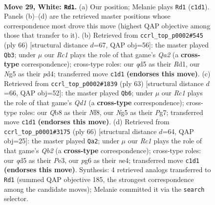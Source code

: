\documentclass[11pt]{article}
\begin{document}
\clearpage

\begin{figure}[p]\centering
\begin{subfigure}{0.46\textwidth}\centering
\resizebox{\linewidth}{!}{%
\newchessgame
\chessboard[
  setfen={1Q6/4npk1/6p1/3q2Np/3p3P/3P2P1/5P2/rNR3K1 w - - 5 29},
  showmover=false,
  pgfstyle=straightmove, color=movearrow, markmove={c1-d1}
]}
\caption{}
\end{subfigure}\hfill
\begin{subfigure}{0.46\textwidth}\centering
\resizebox{\linewidth}{!}{%
\newchessgame
\chessboard[
  setfen={5b2/5pk1/4qp2/2rNp3/3pP3/8/Q4PPP/3R2K1 w - - 7 34},
  showmover=false,
  pgfstyle=straightmove, color=movearrow, markmove={a2-b3}
]}
\caption{}
\end{subfigure}
\\[4pt]
\begin{subfigure}{0.46\textwidth}\centering
\resizebox{\linewidth}{!}{%
\newchessgame
\chessboard[
  setfen={3q1nk1/1p3pp1/7p/r2nQP2/8/1B2PN2/6PP/2R3K1 b - - 5 32},
  showmover=false,
  pgfstyle=straightmove, color=movearrow, markmove={d8-b6}
]}
\caption{}
\end{subfigure}\hfill
\begin{subfigure}{0.46\textwidth}\centering
\resizebox{\linewidth}{!}{%
\newchessgame
\chessboard[
  setfen={8/5p1k/p4qp1/P2p4/3Nn2p/4P2P/1Q3PP1/6K1 w - - 8 34},
  showmover=false,
  pgfstyle=straightmove, color=movearrow, markmove={b2-a2}
]}
\caption{}
\end{subfigure}
\caption{\textbf{Move 29, White: \texttt{Rd1}.} (a) Our position; Melanie plays \texttt{Rd1} (\texttt{c1d1}). Panels (b)--(d) are the retrieved master positions whose correspondence most drove this move (highest QAP objective among those that transfer to it). (b) Retrieved from \texttt{ccrl\_top\_p0002\#545} (ply 66) [structural distance $d$=67, QAP obj=56]: the master played \texttt{Qb3}; under $\mu$ our \emph{Rc1} plays the role of that game's \emph{Qa2} (a \textbf{cross-type} correspondence); cross-type roles: our \emph{q}d5 as their \emph{R}d1, our \emph{N}g5 as their \emph{p}d4; transferred move \texttt{c1d1} \textbf{(endorses this move)}. (c) Retrieved from \texttt{ccrl\_top\_p0002\#1839} (ply 63) [structural distance $d$=66, QAP obj=52]: the master played \texttt{Qb6}; under $\mu$ our \emph{Rc1} plays the role of that game's \emph{Qd1} (a \textbf{cross-type} correspondence); cross-type roles: our \emph{Q}b8 as their \emph{N}f8, our \emph{N}g5 as their \emph{P}g7; transferred move \texttt{c1d1} \textbf{(endorses this move)}. (d) Retrieved from \texttt{ccrl\_top\_p0001\#3175} (ply 66) [structural distance $d$=64, QAP obj=25]: the master played \texttt{Qa2}; under $\mu$ our \emph{Rc1} plays the role of that game's \emph{Qb2} (a \textbf{cross-type} correspondence); cross-type roles: our \emph{q}d5 as their \emph{P}e3, our \emph{p}g6 as their \emph{n}e4; transferred move \texttt{c1d1} \textbf{(endorses this move)}. Synthesis: 4 retrieved analogs transferred to \texttt{Rd1} (summed QAP objective 185, the strongest correspondence among the candidate moves); Melanie committed it via the \texttt{search} selector.}
\label{fig:thought-m56}
\end{figure}
\end{document}
